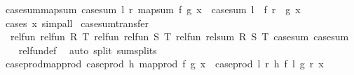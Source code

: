 \begin{isabellebody}
\endisatagproof
{\isafoldproof}%
%
\isadelimproof
\isanewline
%
\endisadelimproof
\isanewline
{}\isamarkupfalse%
\ case{\isacharunderscore}{\kern0pt}sum{\isacharunderscore}{\kern0pt}map{\isacharunderscore}{\kern0pt}sum{\isacharcolon}{\kern0pt}\ {\isachardoublequoteopen}case{\isacharunderscore}{\kern0pt}sum\ l\ r\ {\isacharparenleft}{\kern0pt}map{\isacharunderscore}{\kern0pt}sum\ f\ g\ x{\isacharparenright}{\kern0pt}\ {\isacharequal}{\kern0pt}\ case{\isacharunderscore}{\kern0pt}sum\ {\isacharparenleft}{\kern0pt}l\ {\isasymcirc}\ f{\isacharparenright}{\kern0pt}\ {\isacharparenleft}{\kern0pt}r\ {\isasymcirc}\ g{\isacharparenright}{\kern0pt}\ x{\isachardoublequoteclose}\isanewline
%
\isadelimproof
\ \ %
\endisadelimproof
%
\isatagproof
{}\isamarkupfalse%
\ {\isacharparenleft}{\kern0pt}cases\ x{\isacharparenright}{\kern0pt}\ simp{\isacharunderscore}{\kern0pt}all%
\endisatagproof
{\isafoldproof}%
%
\isadelimproof
\isanewline
%
\endisadelimproof
\isanewline
{}\isamarkupfalse%
\ case{\isacharunderscore}{\kern0pt}sum{\isacharunderscore}{\kern0pt}transfer{\isacharcolon}{\kern0pt}\isanewline
\ \ {\isachardoublequoteopen}rel{\isacharunderscore}{\kern0pt}fun\ {\isacharparenleft}{\kern0pt}rel{\isacharunderscore}{\kern0pt}fun\ R\ T{\isacharparenright}{\kern0pt}\ {\isacharparenleft}{\kern0pt}rel{\isacharunderscore}{\kern0pt}fun\ {\isacharparenleft}{\kern0pt}rel{\isacharunderscore}{\kern0pt}fun\ S\ T{\isacharparenright}{\kern0pt}\ {\isacharparenleft}{\kern0pt}rel{\isacharunderscore}{\kern0pt}fun\ {\isacharparenleft}{\kern0pt}rel{\isacharunderscore}{\kern0pt}sum\ R\ S{\isacharparenright}{\kern0pt}\ T{\isacharparenright}{\kern0pt}{\isacharparenright}{\kern0pt}\ case{\isacharunderscore}{\kern0pt}sum\ case{\isacharunderscore}{\kern0pt}sum{\isachardoublequoteclose}\isanewline
%
\isadelimproof
\ \ %
\endisadelimproof
%
\isatagproof
{}\isamarkupfalse%
\ rel{\isacharunderscore}{\kern0pt}fun{\isacharunderscore}{\kern0pt}def\ \isamarkupfalse%
\ {\isacharparenleft}{\kern0pt}auto\ split{\isacharcolon}{\kern0pt}\ sum{\isachardot}{\kern0pt}splits{\isacharparenright}{\kern0pt}%
\endisatagproof
{\isafoldproof}%
%
\isadelimproof
\isanewline
%
\endisadelimproof
\isanewline
{}\isamarkupfalse%
\ case{\isacharunderscore}{\kern0pt}prod{\isacharunderscore}{\kern0pt}map{\isacharunderscore}{\kern0pt}prod{\isacharcolon}{\kern0pt}\ {\isachardoublequoteopen}case{\isacharunderscore}{\kern0pt}prod\ h\ {\isacharparenleft}{\kern0pt}map{\isacharunderscore}{\kern0pt}prod\ f\ g\ x{\isacharparenright}{\kern0pt}\ {\isacharequal}{\kern0pt}\ case{\isacharunderscore}{\kern0pt}prod\ {\isacharparenleft}{\kern0pt}{\isasymlambda}l\ r{\isachardot}{\kern0pt}\ h\ {\isacharparenleft}{\kern0pt}f\ l{\isacharparenright}{\kern0pt}\ {\isacharparenleft}{\kern0pt}g\ r{\isacharparenright}{\kern0pt}{\isacharparenright}{\kern0pt}\ x{\isachardoublequoteclose}\isanewline

\end{isabellebody}
